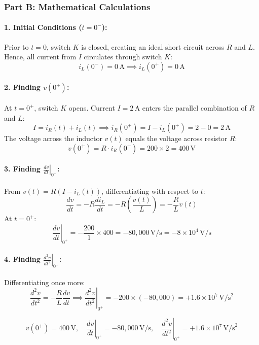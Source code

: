 \documentclass[11pt,a4paper,oneside]{article}
\begin{document}
\subsubsection*{Part B: Mathematical Calculations}
\paragraph{1. Initial Conditions ($t=0^-$):}
Prior to $t=0$, switch $K$ is closed, creating an ideal short circuit across $R$ and $L$. Hence, all current from $I$ circulates through switch $K$:
\[
i_L(0^-) = 0\,\mathrm{A} \implies i_L(0^+) = 0\,\mathrm{A}
\]
\paragraph{2. Finding $v(0^+)$:}
At $t = 0^+$, switch $K$ opens. Current $I = 2\,\mathrm{A}$ enters the parallel combination of $R$ and $L$:
\[
I = i_R(t) + i_L(t) \implies i_R(0^+) = I - i_L(0^+) = 2 - 0 = 2\,\mathrm{A}
\]
The voltage across the inductor $v(t)$ equals the voltage across resistor $R$:
\[
v(0^+) = R \cdot i_R(0^+) = 200 \times 2 = 400\,\mathrm{V}
\]
\paragraph{3. Finding $\left.\frac{dv}{dt}\right|_{0^+}$:}
From $v(t) = R(I - i_L(t))$, differentiating with respect to $t$:
\[
\frac{dv}{dt} = -R \frac{di_L}{dt} = -R \left(\frac{v(t)}{L}\right) = -\frac{R}{L} v(t)
\]
At $t = 0^+$:
\[
\left.\frac{dv}{dt}\right|_{0^+} = -\frac{200}{1} \times 400 = -80,000\,\mathrm{V/s} = -8 \times 10^4\,\mathrm{V/s}
\]
\paragraph{4. Finding $\left.\frac{d^2v}{dt^2}\right|_{0^+}$:}
Differentiating once more:
\[
\frac{d^2v}{dt^2} = -\frac{R}{L} \frac{dv}{dt} \implies \left.\frac{d^2v}{dt^2}\right|_{0^+} = -200 \times (-80,000) = +1.6 \times 10^7\,\mathrm{V/s}^2
\]

\begin{answerbox}
\[
v(0^+) = 400\,\mathrm{V}, \quad \left.\frac{dv}{dt}\right|_{0^+} = -80,000\,\mathrm{V/s}, \quad \left.\frac{d^2v}{dt^2}\right|_{0^+} = +1.6 \times 10^7\,\mathrm{V/s}^2
\]
\end{answerbox}

\newpage

\end{document}

